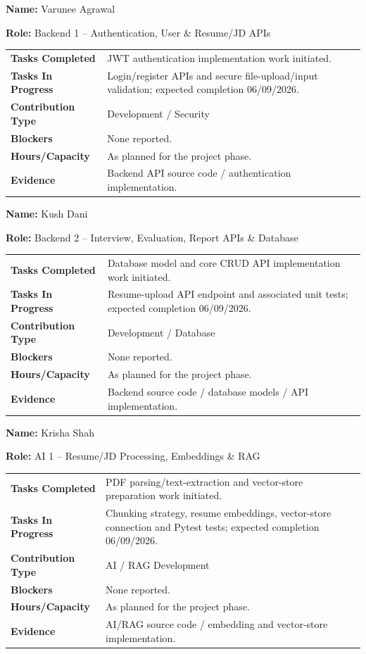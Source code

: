 \documentclass[11pt,a4paper]{article}
\newcommand{\field}[2]{\textbf{#1:} #2\par}
\begin{document}
\vspace{10pt}
\field{Name}{Varunee Agrawal}
\field{Role}{Backend 1 -- Authentication, User \& Resume/JD APIs}

\vspace{4pt}
\begin{tabular}{>{\bfseries}p{} p{}}
\toprule
Tasks Completed & JWT authentication implementation work initiated. \\
Tasks In Progress & Login/register APIs and secure file-upload/input validation; expected completion 06/09/2026. \\
Contribution Type & Development / Security \\
Blockers & None reported. \\
Hours/Capacity & As planned for the project phase. \\
Evidence & Backend API source code / authentication implementation. \\
\bottomrule
\end{tabular}

\vspace{10pt}
\field{Name}{Kush Dani}
\field{Role}{Backend 2 -- Interview, Evaluation, Report APIs \& Database}

\vspace{4pt}
\begin{tabular}{>{\bfseries}p{} p{}}
\toprule
Tasks Completed & Database model and core CRUD API implementation work initiated. \\
Tasks In Progress & Resume-upload API endpoint and associated unit tests; expected completion 06/09/2026. \\
Contribution Type & Development / Database \\
Blockers & None reported. \\
Hours/Capacity & As planned for the project phase. \\
Evidence & Backend source code / database models / API implementation. \\
\bottomrule
\end{tabular}

\newpage
\field{Name}{Krisha Shah}
\field{Role}{AI 1 -- Resume/JD Processing, Embeddings \& RAG}

\vspace{4pt}
\begin{tabular}{>{\bfseries}p{} p{}}
\toprule
Tasks Completed & PDF parsing/text-extraction and vector-store preparation work initiated. \\
Tasks In Progress & Chunking strategy, resume embeddings, vector-store connection and Pytest tests; expected completion 06/09/2026. \\
Contribution Type & AI / RAG Development \\
Blockers & None reported. \\
Hours/Capacity & As planned for the project phase. \\
Evidence & AI/RAG source code / embedding and vector-store implementation. \\
\bottomrule
\end{tabular}
\end{document}
